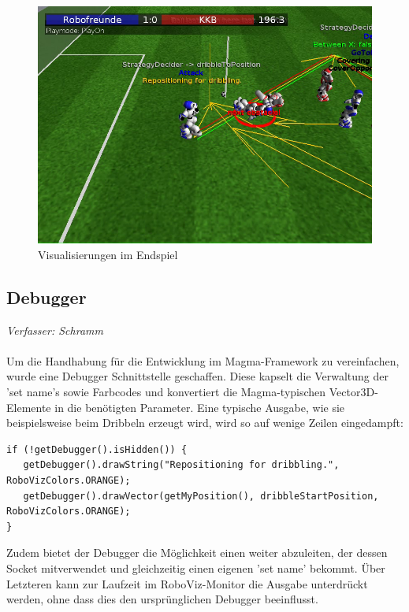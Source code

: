 \begin{figure}[H]
	\centering
	\includegraphics[width=\ScaleIfNeeded]{Grafiken/RoboViz/RoboVizzingToDaMax}
	\caption{Visualisierungen im Endspiel}
	\label{fig:roboviz-endgame}
\end{figure}


\subsection{Debugger}
\label{subsec:Debugger}
\textit{Verfasser: Schramm}\\
\\
Um die Handhabung für die Entwicklung im Magma-Framework zu vereinfachen, wurde eine Debugger Schnittstelle geschaffen. Diese kapselt die Verwaltung der 'set name's sowie Farbcodes und konvertiert die Magma-typischen Vector3D-Elemente in die benötigten Parameter. Eine typische Ausgabe, wie sie beispielsweise beim Dribbeln erzeugt wird, wird so auf wenige Zeilen eingedampft:
\begin{lstlisting}[caption=RoboVizDebugger, captionpos=b, label=lst:Debug]
if (!getDebugger().isHidden()) {
   getDebugger().drawString("Repositioning for dribbling.", RoboVizColors.ORANGE);
   getDebugger().drawVector(getMyPosition(), dribbleStartPosition, RoboVizColors.ORANGE);
}
\end{lstlisting}

Zudem bietet der Debugger die Möglichkeit einen weiter abzuleiten, der dessen Socket mitverwendet und gleichzeitig einen eigenen 'set name' bekommt. Über Letzteren kann zur Laufzeit im RoboViz-Monitor die Ausgabe unterdrückt werden, ohne dass dies den ursprünglichen Debugger beeinflusst.

